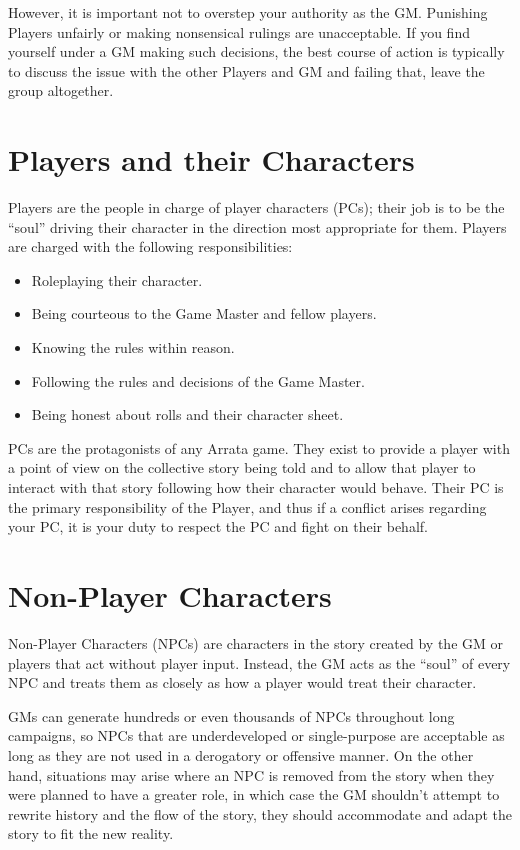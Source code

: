\documentclass[../main.tex]{subfiles}
\begin{document}
    However, it is important not to overstep your authority as the GM. Punishing Players unfairly or making nonsensical rulings are unacceptable. If you find yourself under a GM making such decisions, the best course of action is typically to discuss the issue with the other Players and GM and failing that, leave the group altogether.

    \section{Players and their Characters}

    Players are the people in charge of player characters (PCs); their job is to be the ``soul'' driving their character in the direction most appropriate for them. Players are charged with the following responsibilities:

    \begin{itemize}
        \item Roleplaying their character.
        \item Being courteous to the Game Master and fellow players.
        \item Knowing the rules within reason.
        \item Following the rules and decisions of the Game Master.
        \item Being honest about rolls and their character sheet.
    \end{itemize}

    PCs are the protagonists of any Arrata game. They exist to provide a player with a point of view on the collective story being told and to allow that player to interact with that story following how their character would behave. Their PC is the primary responsibility of the Player, and thus if a conflict arises regarding your PC, it is your duty to respect the PC and fight on their behalf.

    \section{Non-Player Characters}
    Non-Player Characters (NPCs) are characters in the story created by the GM or players that act without player input. Instead, the GM acts as the ``soul'' of every NPC and treats them as closely as how a player would treat their character. 
    
    GMs can generate hundreds or even thousands of NPCs throughout long campaigns, so NPCs that are underdeveloped or single-purpose are acceptable as long as they are not used in a derogatory or offensive manner. On the other hand, situations may arise where an NPC is removed from the story when they were planned to have a greater role, in which case the GM shouldn't attempt to rewrite history and the flow of the story, they should accommodate and adapt the story to fit the new reality.
\end{document}
